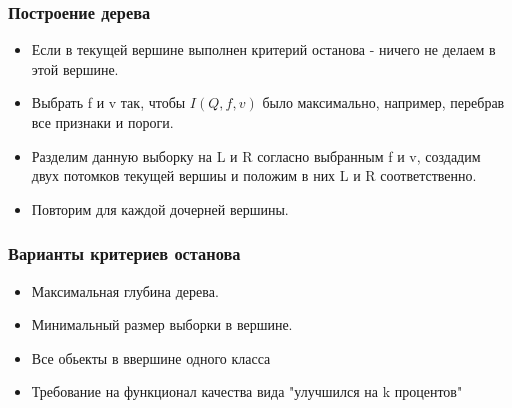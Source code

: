\documentclass[14pt]{beamer}
\begin{document}
\begin{frame}
\frametitle{Построение дерева}
	  \begin {itemize}
	    \item Если в текущей вершине выполнен критерий останова - ничего не делаем в этой вершине.
		\item Выбрать f и v так, чтобы $I(Q, f, v)$ было максимально, например, перебрав все признаки и пороги.
		\item Разделим данную выборку на L и R согласно выбранным f и v, создадим двух потомков текущей вершиы и положим в них L и R соответственно.
		\item Повторим для каждой дочерней вершины.
	  \end {itemize}
\end{frame}

\begin{frame}
\frametitle{Варианты критериев останова}
	  \begin {itemize}
		\item Максимальная глубина дерева.
		\item Минимальный размер выборки в вершине.
		\item Все обьекты в ввершине одного класса
		\item Требование на функционал качества вида "улучшился на k процентов"
	  \end {itemize}
\end{frame}
\end{document}
